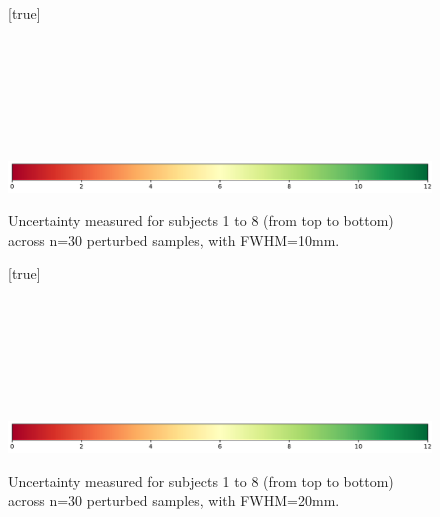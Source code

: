 \documentclass[lettersize,journal]{IEEEtran}
\begin{document}
\begin{landscape}
    \begin{figure}
        \vspace*{-2cm}
        \centering
        [true] \\
         \\
         \\
         \\
         \\
         \\
         \\
         \\
        \includegraphics*[width=.7\linewidth]{figures/colorbar_sigbit.pdf}
        \caption{Uncertainty measured for subjects 1 to 8 (from top to bottom) across n=30 perturbed samples, with FWHM=10mm. }
        \label{fig:uncertainty-maps-10mm}
    \end{figure}
\end{landscape}

\begin{landscape}
    \begin{figure}
        \vspace*{-2cm}
        \centering
        [true] \\
         \\
         \\
         \\
         \\
         \\
         \\
         \\
        \includegraphics*[width=.7\linewidth]{figures/colorbar_sigbit.pdf}
        \caption{Uncertainty measured for subjects 1 to 8 (from top to bottom) across n=30 perturbed samples, with FWHM=20mm. }
        \label{fig:uncertainty-maps-20mm}
    \end{figure}
\end{landscape}
\end{document}
